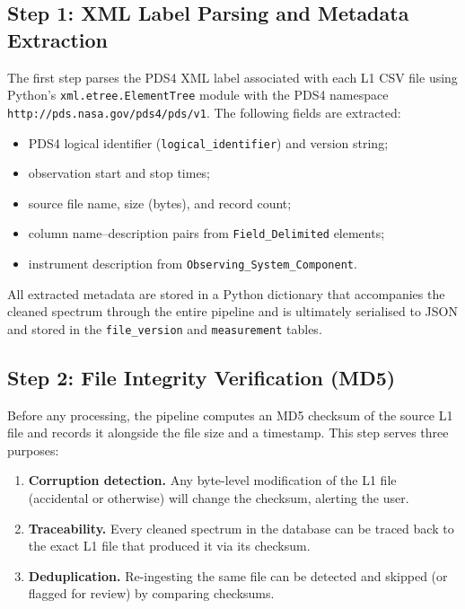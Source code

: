 \documentclass[a4paper,twocolumn,10pt]{article}
\begin{document}
\subsection{Step 1: XML Label Parsing and Metadata Extraction}

The first step parses the PDS4 XML label associated with each L1 CSV
file using Python's \texttt{xml.etree.ElementTree} module with the
PDS4 namespace \texttt{http://pds.nasa.gov/pds4/pds/v1}.  The
following fields are extracted:

\begin{itemize}[nosep,leftmargin=*]
  \item PDS4 logical identifier (\texttt{logical\_identifier}) and
    version string;
  \item observation start and stop times;
  \item source file name, size (bytes), and record count;
  \item column name--description pairs from
    \texttt{Field\_Delimited} elements;
  \item instrument description from
    \texttt{Observing\_System\_Component}.
\end{itemize}

All extracted metadata are stored in a Python dictionary that
accompanies the cleaned spectrum through the entire pipeline and is
ultimately serialised to JSON and stored in the \texttt{file\_version}
and \texttt{measurement} tables.

\subsection{Step 2: File Integrity Verification (MD5)}

Before any processing, the pipeline computes an MD5 checksum of the
source L1 file and records it alongside the file size and a
timestamp.  This step serves three purposes:

\begin{enumerate}[nosep,leftmargin=*]
  \item \textbf{Corruption detection.}  Any byte-level modification of
    the L1 file (accidental or otherwise) will change the checksum,
    alerting the user.
  \item \textbf{Traceability.}  Every cleaned spectrum in the database
    can be traced back to the exact L1 file that produced it via its
    checksum.
  \item \textbf{Deduplication.}  Re-ingesting the same file can be
    detected and skipped (or flagged for review) by comparing
    checksums.
\end{enumerate}
\end{document}
